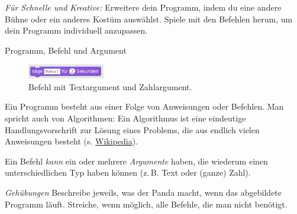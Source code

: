 \emph{Für Schnelle und Kreative:} Erweitere dein Programm, indem du eine andere Bühne oder ein anderes Kostüm auswählst. Spiele mit den Befehlen herum, um dein Programm individuell anzupassen.

\begin{zsfg}{{Programm, Befehl und Argument}}
	\begin{figure}
	   \centering
	   \includegraphics[width=0.3\textwidth]{pics/Befehl-Bsp.png}
	   \caption{Befehl mit Textargument und Zahlargument.}
	   \label{abb:befehlbsp}
	\end{figure}
	Ein Programm besteht aus einer Folge von Anweisungen oder Befehlen. Man spricht auch von Algorithmen: Ein Algorithmus ist eine eindeutige Handlungsvorschrift zur Lösung eines Problems, die aus endlich vielen Anweisungen besteht (s. \href{https://de.wikipedia.org/wiki/Algorithmus}{Wikipedia}).
	
	Ein Befehl \emph{kann} ein oder mehrere \emph{Argumente} haben, die wiederum einen unterschiedlichen Typ haben können (z.\,B. Text oder (ganze) Zahl).
\end{zsfg}

\begin{aufgabe}
	\textit{Gehübungen}\smallbreak
	Beschreibe jeweils, was der Panda macht, wenn das abgebildete Programm läuft. Streiche, wenn möglich, alle Befehle, die man nicht benötigt.
\end{aufgabe}
\begin{figure}[H]
	\centering
	\hspace{0.5cm}
	\label{abb:uebungsbsp_befehle}
\end{figure}